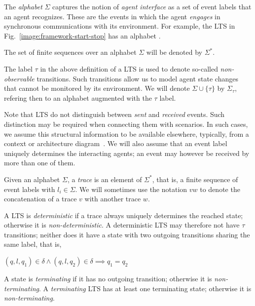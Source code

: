 The \emph{alphabet} $\Sigma$ captures the notion of \emph{agent interface} as a set of event labels that an agent recognizes. These are the events in which the agent \emph{engages} in synchronous communications with its environment. For example, the LTS in Fig.~\ref{image:framework-start-stop} has an alphabet . 

The set of finite sequences over an alphabet $\Sigma$ will be denoted by $\Sigma^{*}$.

The label $\tau$ in the above definition of a LTS is used to denote so-called \emph{non-observable} transitions. Such transitions allow us to model agent state changes that cannot be monitored by its environment. We will denote $\Sigma\cup\{\tau\}$ by $\Sigma_{\tau}$, refering then to an alphabet augmented with the $\tau$ label.

Note that LTS do not distinguish between \emph{sent} and \emph{received} events. Such distinction may be required when connecting them with scenarios. In such cases, we assume this structural information to be available elsewhere, typically, from a context or architecture diagram~\cite{Ward:1985, Magee:1995}. We will also assume that an event label uniquely determines the interacting agents; an event may however be received by more than one of them. 

\begin{definition}[Trace]
Given an alphabet $\Sigma$, a \emph{trace} is an element of $\Sigma^{*}$, that is, a finite sequence of event labels  with $l_i \in \Sigma$. We will sometimes use the notation $vw$ to denote the concatenation of a trace $v$ with another trace $w$.
\end{definition}

\begin{definition}
A LTS is \emph{deterministic} if a trace always uniquely determines the reached state; otherwise it is \emph{non-deterministic}. A deterministic LTS may therefore not have $\tau$ transitions; neither does it have a state with two outgoing transitions sharing the same label, that is, 
\begin{center}$(q,l,q_1) \in \delta \wedge (q,l,q_2) \in \delta \implies q_1 = q_2$\end{center}
\end{definition}

\begin{definition}
A state is \emph{terminating} if it has no outgoing transition; otherwise it is \emph{non-terminating}. A \emph{terminating} LTS has at least one terminating state; otherwise it is \emph{non-terminating}. 
\end{definition}

